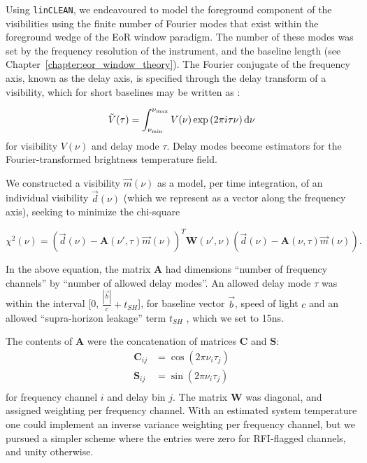 Using {\tt linCLEAN}, we endeavoured to model the foreground component of the visibilities using the finite number of Fourier modes that exist within the foreground wedge of the EoR window paradigm. The number of these modes was set by the frequency resolution of the instrument, and the baseline length (see Chapter~\ref{chapter:eor_window_theory}).
The Fourier conjugate of the frequency axis, known as the delay axis, is specified through the delay transform of a visibility, which for short baselines may be written as \citep{Parsons.12b}:

\begin{equation}
\tilde{V}(\tau) = \int^{\nu_{\rm max}}_{\nu_{\rm min}} V(\nu) \exp\left(2\pi i \tau \nu\right) {\rm d}\nu
\end{equation}
for visibility $V(\nu)$ and delay mode $\tau$. Delay modes become estimators for the Fourier-transformed brightness temperature field.

We constructed a visibility $\vec{m}(\nu)$ as a model, per time integration, of an individual visibility $\vec{d}(\nu)$ (which we represent as a vector along the frequency axis), seeking to minimize the chi-square

\begin{equation}
\chi^2(\nu) = (\vec{d}(\nu) - \textbf{A}(\nu',\tau)\vec{m}(\nu))^T \textbf{W}(\nu',\nu)(\vec{d}(\nu) - \textbf{A}(\nu,\tau)\vec{m}(\nu)).
\label{eq:linclean_chisquare}
\end{equation}

In the above equation, the matrix $\textbf{A}$ had dimensions ``number of frequency channels'' by ``number of allowed delay modes''. An allowed delay mode $\tau$ was within the interval [0,  $\frac{|\vec{b}|}{c} + t_{SH}$], for baseline vector $\vec{b}$, speed of light $c$ and an allowed ``supra-horizon leakage'' term $t_{SH}$ \citep{Pober.13}, which we set to 15ns.

The contents of $\textbf{A}$ were the concatenation of matrices $\textbf{C}$ and  $\textbf{S}$:
\begin{eqnarray}
\textbf{C}_{ij} &=  \cos(2\pi \nu_i \tau_j)\\
\textbf{S}_{ij} &=  \sin(2\pi \nu_i \tau_j)\\
\end{eqnarray}
for frequency channel $i$ and delay bin $j$.
The matrix $\textbf{W}$ was diagonal, and assigned weighting per frequency channel. With an estimated system temperature one could implement an inverse variance weighting per frequency channel, but we pursued a simpler scheme where the entries were zero for RFI-flagged channels, and unity otherwise.

